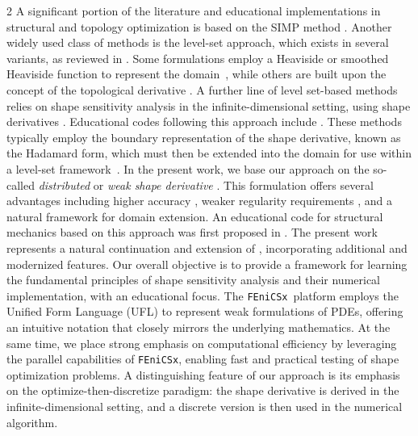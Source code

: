 \documentclass[a4paper, oneside]{article}
\newcommand{\fx}{\texttt{FEniCSx}}
\begin{document}
\begin{multicols}{2}
A significant portion of the literature and educational implementations in structural and topology optimization is based on the SIMP method \cite{Sigmund2014}.
Another widely used class of methods is the level-set approach, which exists in several variants, as reviewed in \cite{vanDijk2013}. Some formulations employ a Heaviside or smoothed Heaviside function to represent the domain~\cite{MR1951408}, while others are built upon the concept of the topological derivative \cite{MR2235384,Novotny2013,MR4916810}.
A further line of level set-based methods relies on shape sensitivity analysis in the infinite-dimensional setting, using shape derivatives \cite{MR2731611,SokZol92}. Educational codes following this approach include \cite{Challis2009,MR2459656}. These methods typically employ the boundary representation of the shape derivative, known as the Hadamard form, which must then be extended into the domain for use within a level-set framework~\cite{MR2225309}.
In the present work, we base our approach on the so-called {\it distributed} or {\it weak shape derivative} \cite{LAURAIN2020328,MR3535238}.
This formulation offers several advantages including higher accuracy \cite{MR2642680,MR3348199},  weaker regularity requirements \cite{LAURAIN2020328}, and a natural framework for domain extension. An educational code for structural mechanics based on this approach was first proposed in \cite{MR3843884}. The present work represents a natural continuation and extension of \cite{MR3843884}, incorporating additional and modernized features.
Our overall objective is to provide a framework for learning the fundamental principles of shape sensitivity analysis and their numerical implementation, with an educational focus. 
The \fx\ platform \cite{fenicsx} employs the Unified Form Language (UFL) to represent weak formulations of PDEs, offering an intuitive notation that closely mirrors the underlying mathematics.
At the same time, we place strong emphasis on computational efficiency by leveraging the parallel capabilities of \fx, enabling fast and practical testing of shape optimization problems.
A distinguishing feature of our approach is its emphasis on the optimize-then-discretize paradigm: the shape derivative is derived in the infinite-dimensional setting, and a discrete version is then used in the numerical algorithm.


\end{multicols}
\end{document}
